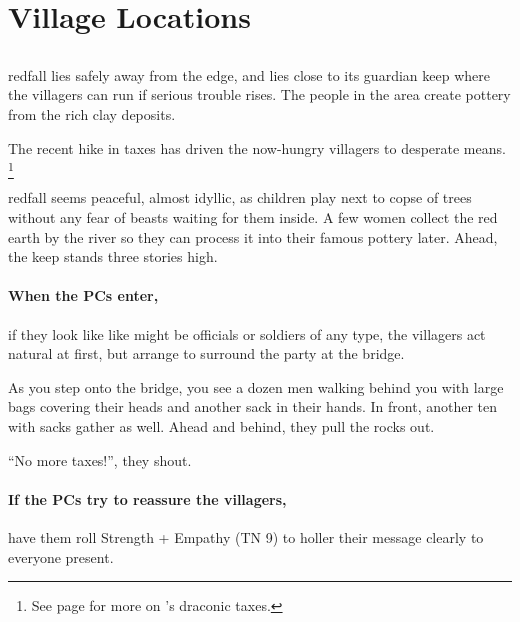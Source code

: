 \section{Village Locations}

\begin{multicols}{2}


\subsection{}
\label{redfallVillage}

\Gls{redfall} lies safely away from the \gls{edge}, and lies close to its guardian keep where the villagers can run if serious trouble rises.
The people in the area create pottery from the rich clay deposits.

The recent hike in taxes has driven the now-hungry villagers to desperate means.%
\footnote{See page \pageref{desperatemeasures} for more on 's draconic taxes.}

\begin{boxtext}
  \Gls{redfall} seems peaceful, almost idyllic, as children play next to copse of trees without any fear of beasts waiting for them inside.
  A few women collect the red earth by the river so they can process it into their famous pottery later.
  Ahead, the keep stands three stories high.
\end{boxtext}

\paragraph{When the PCs enter,}
if they look like like might be officials or soldiers of any type, the villagers act natural at first, but arrange to surround the party at the bridge.

\begin{boxtext}

  As you step onto the bridge, you see a dozen men walking behind you with large bags covering their heads and another sack in their hands.
  In front, another ten with sacks gather as well.
  Ahead and behind, they pull the rocks out.

  ``No more taxes!'', they shout.

\end{boxtext}

\paragraph{If the PCs try to reassure the villagers,}
have them roll Strength + Empathy (TN 9) to holler their message clearly to everyone present.


\end{multicols}
